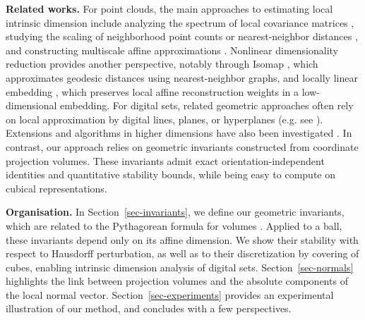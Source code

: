 \noindent\textbf{Related works.}  For point clouds, the main
approaches to estimating local intrinsic dimension include analyzing
the spectrum of local covariance matrices \cite{Fukunaga:1971},
studying the scaling of neighborhood point counts or nearest-neighbor
distances \cite{Levina:2004,Farahmand:2007}, and constructing
multiscale affine approximations \cite{Allard:2012}.  Nonlinear
dimensionality reduction provides another perspective, notably through
Isomap \cite{Tenenbaum:2000}, which approximates geodesic distances
using nearest-neighbor graphs, and locally linear embedding
\cite{Roweis:2000}, which preserves local affine reconstruction
weights in a low-dimensional embedding.  For digital sets, related
geometric approaches often rely on local approximation by digital
lines, planes, or hyperplanes (e.g. see
\cite{Klette:2004}). Extensions and algorithms in higher dimensions
have also been investigated
\cite{Gerard:2005,Charrier:2011,Provot:2011}.  In contrast, our
approach relies on geometric invariants constructed from coordinate
projection volumes. These invariants admit exact
orientation-independent identities and quantitative stability bounds,
while being easy to compute on cubical representations.


\noindent\textbf{Organisation.}  In Section~\ref{sec-invariants}, we
define our geometric invariants, which are related to the Pythagorean
formula for volumes
\cite{Conant01031974,Czyzewska:1991,ancel2023pythagorean}. Applied to
a ball, these invariants depend only on its affine dimension. We
show their stability with respect to Hausdorff perturbation, as
well as to their discretization by covering of cubes, enabling
intrinsic dimension analysis of digital
sets. Section~\ref{sec-normals} highlights the link between projection
volumes and the absolute components of the local normal
vector. Section~\ref{sec-experiments} provides an experimental
illustration of our method, and concludes with a few perspectives.


